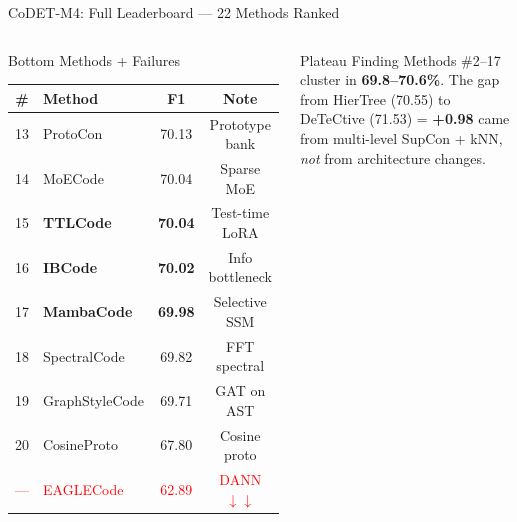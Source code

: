 \documentclass[aspectratio=169, 10pt]{beamer}
\begin{document}
\begin{frame}{CoDET-M4: Full Leaderboard --- 22 Methods Ranked}
\begin{columns}[T]
\begin{block}{Bottom Methods + Failures}
\centering\scriptsize
\begin{tabular}{clcc}
\toprule
\textbf{\#} & \textbf{Method} & \textbf{F1} & \textbf{Note} \\
\midrule
13 & ProtoCon & 70.13 & Prototype bank \\
14 & MoECode & 70.04 & Sparse MoE \\
\rowcolor{newbg}
15 & \textbf{TTLCode} & \textbf{70.04} & Test-time LoRA \\
\rowcolor{newbg}
16 & \textbf{IBCode} & \textbf{70.02} & Info bottleneck \\
\rowcolor{newbg}
17 & \textbf{MambaCode} & \textbf{69.98} & Selective SSM \\
18 & SpectralCode & 69.82 & FFT spectral \\
19 & GraphStyleCode & 69.71 & GAT on AST \\
20 & CosineProto & 67.80 & Cosine proto \\
\midrule
\textcolor{red}{---} & \textcolor{red}{EAGLECode} & \textcolor{red}{62.89} & \textcolor{red}{DANN $\downarrow\downarrow$} \\
\bottomrule
\end{tabular}
\end{block}

\begin{alertblock}{\scriptsize Plateau Finding}
\scriptsize
Methods \#2--17 cluster in \textbf{69.8--70.6\%}. The gap from HierTree (70.55) to DeTeCtive (71.53) = \textbf{+0.98} came from multi-level SupCon + kNN, \emph{not} from architecture changes.
\end{alertblock}
\end{columns}
\end{frame}
\end{document}
